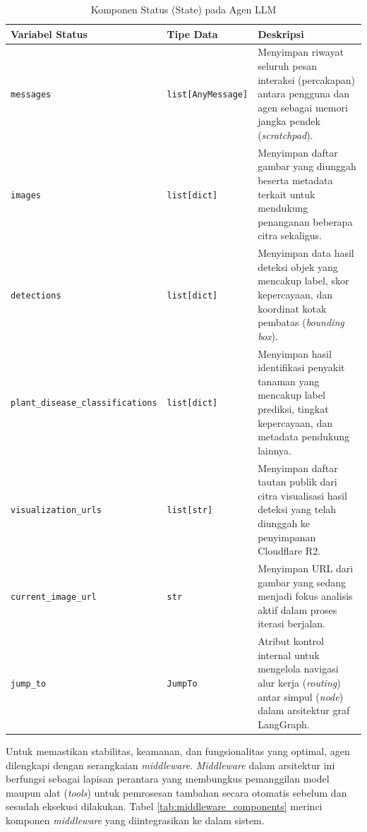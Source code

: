 \begin{table}[H]
    \centering
    \caption{Komponen Status (State) pada Agen LLM}
    \label{tab:state_components}
    \small
    \begin{tabular}{|l|l|p{4cm}|}
    \hline
    Variabel Status & Tipe Data & Deskripsi \\ \hline
    \texttt{messages} & \texttt{list[AnyMessage]} & Menyimpan riwayat seluruh pesan interaksi (percakapan) antara pengguna dan agen sebagai memori jangka pendek (\textit{scratchpad}). \\ \hline
    \texttt{images} & \texttt{list[dict]} & Menyimpan daftar gambar yang diunggah beserta metadata terkait untuk mendukung penanganan beberapa citra sekaligus. \\ \hline
    \texttt{detections} & \texttt{list[dict]} & Menyimpan data hasil deteksi objek yang mencakup label, skor kepercayaan, dan koordinat kotak pembatas (\textit{bounding box}). \\ \hline
    \texttt{plant\_disease\_classifications} & \texttt{list[dict]} & Menyimpan hasil identifikasi penyakit tanaman yang mencakup label prediksi, tingkat kepercayaan, dan metadata pendukung lainnya. \\ \hline
    \texttt{visualization\_urls} & \texttt{list[str]} & Menyimpan daftar tautan publik dari citra visualisasi hasil deteksi yang telah diunggah ke penyimpanan Cloudflare R2. \\ \hline
    \texttt{current\_image\_url} & \texttt{str} & Menyimpan URL dari gambar yang sedang menjadi fokus analisis aktif dalam proses iterasi berjalan. \\ \hline
    \texttt{jump\_to} & \texttt{JumpTo} & Atribut kontrol internal untuk mengelola navigasi alur kerja (\textit{routing}) antar simpul (\textit{node}) dalam arsitektur graf LangGraph. \\ \hline
    \end{tabular}
\end{table}

Untuk memastikan stabilitas, keamanan, dan fungsionalitas yang optimal, agen dilengkapi dengan serangkaian \textit{middleware}. \textit{Middleware} dalam arsitektur ini berfungsi sebagai lapisan perantara yang membungkus pemanggilan model maupun alat (\textit{tools}) untuk pemrosesan tambahan secara otomatis sebelum dan sesudah eksekusi dilakukan. Tabel \ref{tab:middleware_components} merinci komponen \textit{middleware} yang diintegrasikan ke dalam sistem.

